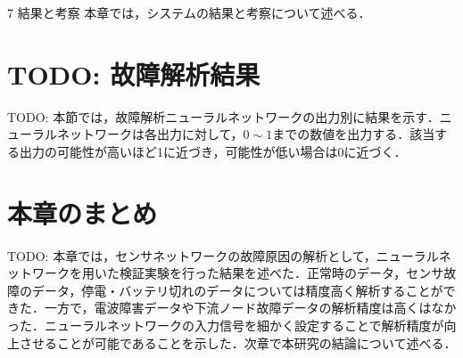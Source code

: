 \chapterhead
{7}
{結果と考察}
{本章では，システムの結果と考察について述べる．}

\newpage
\section{TODO: 故障解析結果}
TODO: 本節では，故障解析ニューラルネットワークの出力別に結果を示す．ニューラルネットワークは各出力に対して，$0 \sim 1$までの数値を出力する．該当する出力の可能性が高いほど1に近づき，可能性が低い場合は0に近づく．

\newpage

\section{本章のまとめ}
TODO: 本章では，センサネットワークの故障原因の解析として，ニューラルネットワークを用いた検証実験を行った結果を述べた．正常時のデータ，センサ故障のデータ，停電・バッテリ切れのデータについては精度高く解析することができた．一方で，電波障害データや下流ノード故障データの解析精度は高くはなかった．ニューラルネットワークの入力信号を細かく設定することで解析精度が向上させることが可能であることを示した．次章で本研究の結論について述べる．
\newpage
